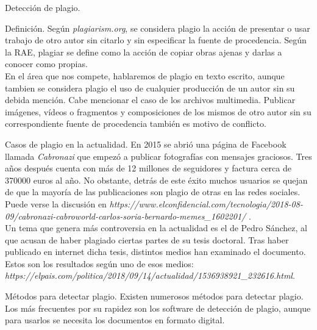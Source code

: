 \documentclass[12pt]{article}
\begin{document}
	\begin{section}{Detecci\'on de plagio.}
		
		\begin{subsection}{Definici\'on.}
			Seg\'un \textit{plagiarism.org}, se considera plagio la acci\'on de presentar o usar trabajo de otro autor sin citarlo y sin especificar la fuente de procedencia.
			Seg\'un la RAE, plagiar se define como la acci\'on de copiar obras ajenas y darlas a conocer como propias.\\
			
			En el \'area que nos compete, hablaremos de plagio en texto escrito, aunque tambien se considera plagio el uso de cualquier producci\'on de un autor sin su debida menci\'on. Cabe mencionar el caso de los archivos multimedia. Publicar im\'agenes, v\'ideos o fragmentos y composiciones de los mismos de otro autor sin su correspondiente fuente de procedencia tambi\'en es motivo de conflicto.
			
		\end{subsection}
		
		\begin{subsection}{Casos de plagio en la actualidad.}
			En 2015 se abri\'o una p\'agina de Facebook llamada \textit{Cabronazi} que empez\'o a publicar fotograf\'ias con mensajes graciosos. Tres a\~nos despu\'es cuenta con m\'as de 12 millones de seguidores y factura cerca de 370000 euros al a\~no. No obstante, detr\'as de este \'exito muchos usuarios se quejan de que la mayor\'ia de las publicaciones son plagio de otras en las redes sociales. Puede verse la discusi\'on en \textit{https://www.elconfidencial.com/tecnologia/2018-08-09/cabronazi-cabroworld-carlos-soria-bernardo-memes\_1602201/} .\\
			
			
			Un tema que genera m\'as controversia en la actualidad es el de Pedro S\'anchez, al que acusan de haber plagiado ciertas partes de su tesis doctoral. Tras haber publicado en internet dicha tesis, distintos medios han examinado el documento. Estos son los resultados seg\'un uno de esos medios: \textit{https://elpais.com/politica/2018/09/14/actualidad/1536938921\_232616.html}.
			
		\end{subsection}
		
		\begin{subsection}{M\'etodos para detectar plagio.}
			Existen numerosos m\'etodos para detectar plagio. Los m\'as frecuentes por su rapidez son los software de detecci\'on de plagio, aunque para usarlos se necesita los documentos en formato digital.\\ 
			\begin{itemize}
				


\end{itemize}
\end{subsection}
\end{section}
\end{document}
